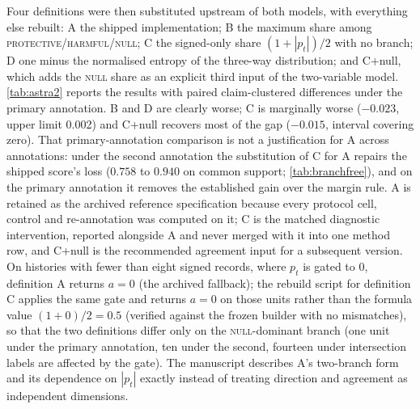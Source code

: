\documentclass[11pt]{article}
\begin{document}
Four definitions were then substituted upstream of both models, with everything
else rebuilt: A the shipped implementation; B the maximum share among
\textsc{protective}/\textsc{harmful}/\textsc{null}; C the signed-only share $(1+|p_t|)/2$ with no
branch; D one minus the normalised entropy of the three-way distribution; and C+null, which adds the
\textsc{null} share as an explicit third input of the two-variable model. \cref{tab:astra2}
reports the results with paired claim-clustered differences under the primary annotation. B and D
are clearly worse; C is marginally worse ($-0.023$, upper limit 0.002) and C+null recovers most of
the gap ($-0.015$, interval covering zero). That primary-annotation comparison is not a
justification for A across annotations: under the second annotation the substitution of C for A
repairs the shipped score's loss ($0.758$ to $0.940$ on common support; \cref{tab:branchfree}),
and on the primary annotation it removes the established gain over the margin rule. A is retained
as the archived reference specification because every protocol cell, control and re-annotation was
computed on it; C is the matched diagnostic intervention, reported alongside A and never merged
with it into one method row, and C+null is the recommended agreement input for a subsequent
version. On histories with fewer than eight signed records, where $p_t$ is gated to 0, definition
A returns $a=0$ (the archived fallback); the rebuild script for definition C applies the same
gate and returns $a=0$ on those units rather than the formula value $(1+0)/2=0.5$ (verified
against the frozen builder with no mismatches), so that the two definitions differ only on the
\textsc{null}-dominant branch (one unit under the primary annotation, ten under the second,
fourteen under intersection labels are affected by the gate).
The manuscript describes A's two-branch form and its dependence on $|p_t|$ exactly instead of
treating direction and agreement as independent dimensions.
\end{document}
